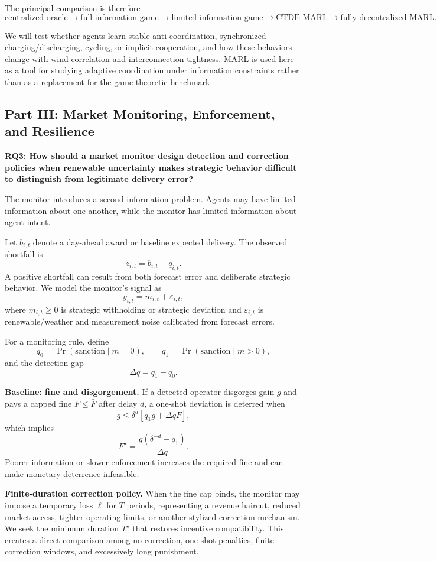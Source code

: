 \documentclass[10pt]{article}
\begin{document}
The principal comparison is therefore
\[
\text{centralized oracle}
\rightarrow
\text{full-information game}
\rightarrow
\text{limited-information game}
\rightarrow
\text{CTDE MARL}
\rightarrow
\text{fully decentralized MARL}.
\]

We will test whether agents learn stable anti-coordination, synchronized charging/discharging, cycling, or implicit cooperation, and how these behaviors change with wind correlation and interconnection tightness. MARL is used here as a tool for studying adaptive coordination under information constraints rather than as a replacement for the game-theoretic benchmark.

\subsection*{Part III: Market Monitoring, Enforcement, and Resilience}

\textbf{RQ3: How should a market monitor design detection and correction policies when renewable uncertainty makes strategic behavior difficult to distinguish from legitimate delivery error?}

The monitor introduces a second information problem. Agents may have limited information about one another, while the monitor has limited information about agent intent.

Let $b_{i,t}$ denote a day-ahead award or baseline expected delivery. The observed shortfall is
\[
z_{i,t}=b_{i,t}-q_{i,t}.
\]
A positive shortfall can result from both forecast error and deliberate strategic behavior. We model the monitor's signal as
\[
y_{i,t}=m_{i,t}+\varepsilon_{i,t},
\]
where $m_{i,t}\ge0$ is strategic withholding or strategic deviation and $\varepsilon_{i,t}$ is renewable/weather and measurement noise calibrated from forecast errors.

For a monitoring rule, define
\[
q_0=\Pr(\text{sanction}\mid m=0),
\qquad
q_1=\Pr(\text{sanction}\mid m>0),
\]
and the detection gap
\[
\Delta q=q_1-q_0.
\]

\textbf{Baseline: fine and disgorgement.}
If a detected operator disgorges gain $g$ and pays a capped fine $F\le\bar F$ after delay $d$, a one-shot deviation is deterred when
\[
g
\le
\delta^d
\left[
q_1g+\Delta qF
\right],
\]
which implies
\[
F^\star
=
\frac{g(\delta^{-d}-q_1)}{\Delta q}.
\]
Poorer information or slower enforcement increases the required fine and can make monetary deterrence infeasible.

\textbf{Finite-duration correction policy.}
When the fine cap binds, the monitor may impose a temporary loss $\ell$ for $T$ periods, representing a revenue haircut, reduced market access, tighter operating limits, or another stylized correction mechanism. We seek the minimum duration $T^\star$ that restores incentive compatibility. This creates a direct comparison among no correction, one-shot penalties, finite correction windows, and excessively long punishment.
\end{document}
